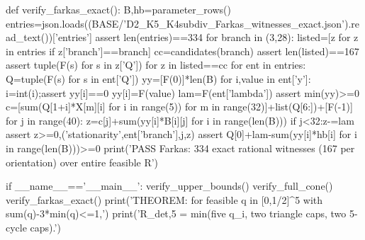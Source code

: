 \documentclass[UTF8,11pt,a4paper]{ctexart}
\begin{document}
\begin{CodeListing}
def verify_farkas_exact():
    B,hb=parameter_rows()
    entries=json.loads((BASE/'D2_K5_K4subdiv_Farkas_witnesses_exact.json').read_text())['entries']
    assert len(entries)==334
    for branch in (3,28):
        listed=[z for z in entries if z['branch']==branch]
        cc=candidates(branch)
        assert len(listed)==167
        assert {tuple(F(s) for s in z['Q']) for z in listed}==cc
    for ent in entries:
        Q=tuple(F(s) for s in ent['Q'])
        yy=[F(0)]*len(B)
        for i,value in ent['y']:
            i=int(i);assert yy[i]==0
            yy[i]=F(value)
        lam=F(ent['lambda'])
        assert min(yy)>=0
        c=[sum(Q[1+i]*X[m][i] for i in range(5)) for m in range(32)]+list(Q[6:])+[F(-1)]
        for j in range(40):
            z=c[j]+sum(yy[i]*B[i][j] for i in range(len(B)))
            if j<32:z-=lam
            assert z>=0,('stationarity',ent['branch'],j,z)
        assert Q[0]+lam-sum(yy[i]*hb[i] for i in range(len(B)))>=0
    print('PASS Farkas: 334 exact rational witnesses (167 per orientation) over entire feasible R')

if __name__=='__main__':
    verify_upper_bounds()
    verify_full_cone()
    verify_farkas_exact()
    print('THEOREM: for feasible q in [0,1/2]^5 with sum(q)-3*min(q)<=1,')
    print('R_det,5 = min(five q_i, two triangle caps, two 5-cycle caps).')
\end{CodeListing}
\end{document}
